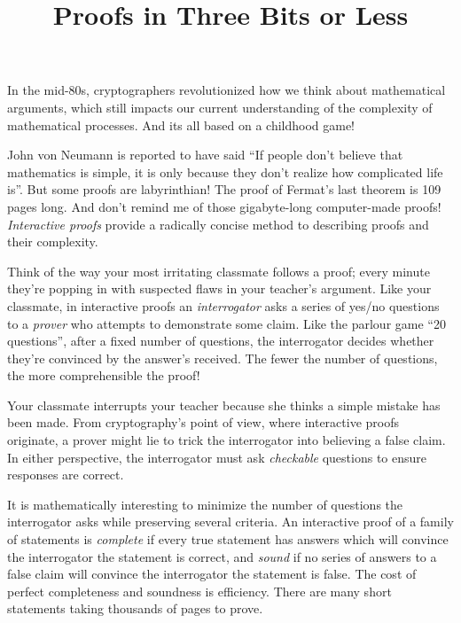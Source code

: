 \documentclass{article}
\title{Proofs in Three Bits or Less}
\author{}
\date{\vspace{-10ex}}
\theoremstyle{plain}
\theoremstyle{remark}
\theoremstyle{definition}
\begin{document}
\maketitle



{\Large In the mid-80s, cryptographers revolutionized how we think about mathematical arguments, which still impacts our current understanding of the complexity of mathematical processes. And its all based on a childhood game!}

\begin{multicols}{2}

John von Neumann is reported to have said ``If people don't believe that mathematics is simple, it is only because they don't realize how complicated life is''. But some proofs are labyrinthian! The proof of Fermat's last theorem is 109 pages long. And don’t remind me of those gigabyte-long computer-made proofs! {\it Interactive proofs} provide a radically concise method to describing proofs and their complexity.

Think of the way your most irritating classmate follows a proof; every minute they're popping in with suspected flaws in your teacher's argument. Like your classmate, in interactive proofs an {\it interrogator} asks a series of yes/no questions to a {\it prover} who attempts to demonstrate some claim. Like the parlour game ``20 questions'', after a fixed number of questions, the interrogator decides whether they're convinced by the answer's received. The fewer the number of questions, the more comprehensible the proof!

Your classmate interrupts your teacher because she thinks a simple mistake has been made. From cryptography's point of view, where interactive proofs originate, a prover might lie to trick the interrogator into believing a false claim. In either perspective, the interrogator must ask {\it checkable} questions to ensure responses are correct.

It is mathematically interesting to minimize the number of questions the interrogator asks while preserving several criteria. An interactive proof of a family of statements is {\it complete} if every true statement has answers which will convince the interrogator the statement is correct, and {\it sound} if no series of answers to a false claim will convince the interrogator the statement is false. The cost of perfect completeness and soundness is efficiency. There are many short statements taking thousands of pages to prove.


\end{multicols}
\end{document}
